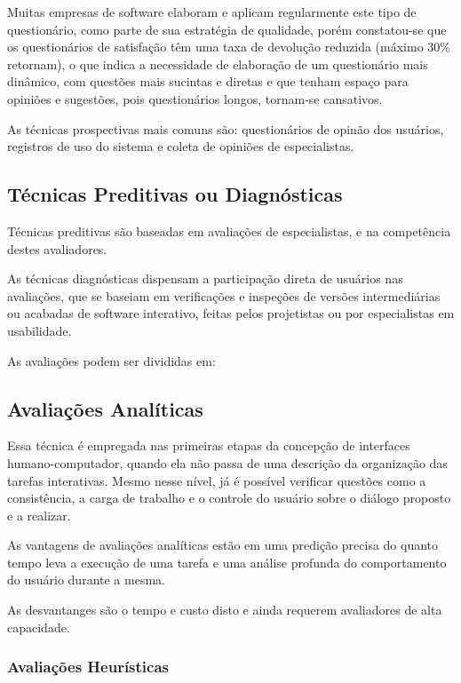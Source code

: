 Muitas empresas de software elaboram e aplicam regularmente este tipo de questionário, como parte de sua estratégia de qualidade, porém constatou-se que os questionários de satisfação têm uma taxa de devolução reduzida (máximo 30\% retornam), o que indica a necessidade de elaboração de um questionário mais dinâmico, com questões mais sucintas e diretas e que tenham espaço para opiniões e sugestões, pois questionários longos, tornam-se cansativos.
\cite{cybil_apostila}

As técnicas prospectivas mais comuns são: questionários de opinão dos usuários, registros de uso do sistema e coleta de opiniões de especialistas. 

\subsection{Técnicas Preditivas ou Diagnósticas}

Técnicas preditivas são baseadas em avaliações de especialistas, e na competência destes avaliadores. 

As técnicas diagnósticas dispensam a participação direta de usuários nas avaliações, que se baseiam em verificações e inspeções de versões intermediárias ou acabadas de software interativo, feitas pelos projetistas ou por especialistas em usabilidade.
\cite{cybil_apostila}

As avaliações podem ser divididas em: 

\subsection{Avaliações Analíticas}

Essa técnica é empregada nas primeiras etapas da concepção de interfaces humano-computador, quando ela não passa de uma descrição da organização das tarefas interativas. Mesmo nesse nível, já é possível verificar questões como a consistência, a carga de trabalho e o controle do usuário sobre o diálogo proposto e a realizar. 
\cite{cybil_apostila}

As vantagens de avaliações analíticas estão em uma predição precisa do quanto tempo leva a execução de uma tarefa e uma análise profunda do comportamento do usuário durante a mesma.

As desvantanges são o tempo e custo disto e ainda requerem avaliadores de alta capacidade.
\cite{andreas_holzinger}

\subsubsection{Avaliações Heurísticas}

